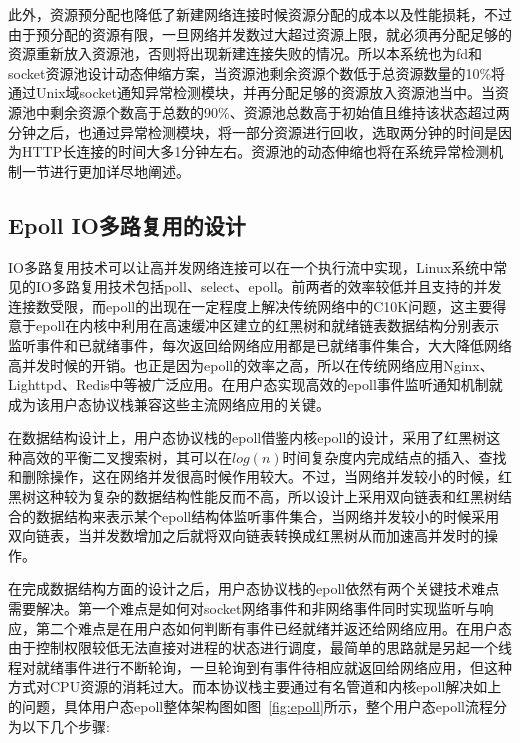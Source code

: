 此外，资源预分配也降低了新建网络连接时候资源分配的成本以及性能损耗，不过由于预分配的资源有限，一旦网络并发数过大超过资源上限，就必须再分配足够的资源重新放入资源池，否则将出现新建连接失败的情况。所以本系统也为fd和socket资源池设计动态伸缩方案，当资源池剩余资源个数低于总资源数量的10\%将通过Unix域socket通知异常检测模块，并再分配足够的资源放入资源池当中。当资源池中剩余资源个数高于总数的90\%、资源池总数高于初始值且维持该状态超过两分钟之后，也通过异常检测模块，将一部分资源进行回收，选取两分钟的时间是因为HTTP长连接的时间大多1分钟左右。资源池的动态伸缩也将在系统异常检测机制一节进行更加详尽地阐述。

\subsection{Epoll IO多路复用的设计}

IO多路复用技术可以让高并发网络连接可以在一个执行流中实现，Linux系统中常见的IO多路复用技术包括poll、select、epoll。前两者的效率较低并且支持的并发连接数受限，而epoll的出现在一定程度上解决传统网络中的C10K问题，这主要得意于epoll在内核中利用在高速缓冲区建立的红黑树和就绪链表数据结构分别表示监听事件和已就绪事件，每次返回给网络应用都是已就绪事件集合，大大降低网络高并发时候的开销。也正是因为epoll的效率之高，所以在传统网络应用Nginx、Lighttpd、Redis中等被广泛应用。在用户态实现高效的epoll事件监听通知机制就成为该用户态协议栈兼容这些主流网络应用的关键。

在数据结构设计上，用户态协议栈的epoll借鉴内核epoll的设计，采用了红黑树这种高效的平衡二叉搜索树，其可以在$log(n)$时间复杂度内完成结点的插入、查找和删除操作，这在网络并发很高时候作用较大。不过，当网络并发较小的时候，红黑树这种较为复杂的数据结构性能反而不高，所以设计上采用双向链表和红黑树结合的数据结构来表示某个epoll结构体监听事件集合，当网络并发较小的时候采用双向链表，当并发数增加之后就将双向链表转换成红黑树从而加速高并发时的操作。

在完成数据结构方面的设计之后，用户态协议栈的epoll依然有两个关键技术难点需要解决。第一个难点是如何对socket网络事件和非网络事件同时实现监听与响应，第二个难点是在用户态如何判断有事件已经就绪并返还给网络应用。在用户态由于控制权限较低无法直接对进程的状态进行调度，最简单的思路就是另起一个线程对就绪事件进行不断轮询，一旦轮询到有事件待相应就返回给网络应用，但这种方式对CPU资源的消耗过大。而本协议栈主要通过有名管道和内核epoll解决如上的问题，具体用户态epoll整体架构图如图~\ref{fig:epoll}所示，整个用户态epoll流程分为以下几个步骤:

